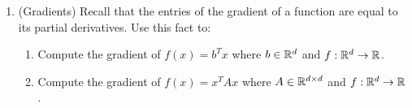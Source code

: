 \documentclass[12pt,twoside]{article}
\begin{document}
\begin{enumerate}
\item (Gradients)
Recall that the entries of the gradient of a function are equal to its partial derivatives. Use this fact to: 
\begin{enumerate}
\item Compute the gradient of $f(x) = b^T x$ where $b \in \mathbb{R}^{d}$ and $f: \mathbb{R}^{d} \rightarrow \mathbb{R} $.
\item Compute the gradient of $f(x) = x^T A x$ where $A \in \mathbb{R}^{d\times d}$ and $f: \mathbb{R}^{d} \rightarrow \mathbb{R} $.
\end{enumerate}
  
\end{enumerate}
\end{document}
